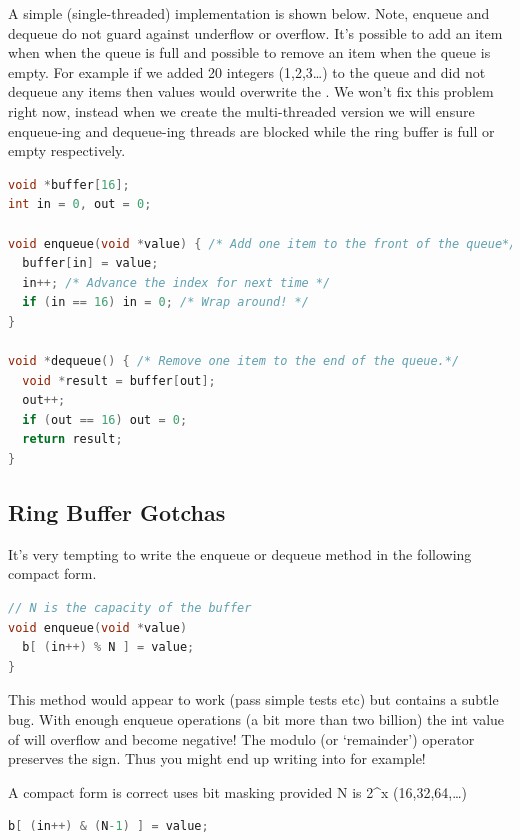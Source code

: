 A simple (single-threaded) implementation is shown below.
Note, enqueue and dequeue do not guard against underflow or overflow.
It's possible to add an item when when the queue is full and possible to remove an item when the queue is empty.
For example if we added 20 integers (1,2,3\ldots{}) to the queue and did not dequeue any items then values  would overwrite the .
We won't fix this problem right now, instead when we create the multi-threaded version we will ensure enqueue-ing and dequeue-ing threads are blocked while the ring buffer is full or empty respectively.

\begin{lstlisting}[language=C]
void *buffer[16];
int in = 0, out = 0;

void enqueue(void *value) { /* Add one item to the front of the queue*/
  buffer[in] = value;
  in++; /* Advance the index for next time */
  if (in == 16) in = 0; /* Wrap around! */
}

void *dequeue() { /* Remove one item to the end of the queue.*/
  void *result = buffer[out];
  out++;
  if (out == 16) out = 0;
  return result;
}
\end{lstlisting}

\subsection{Ring Buffer Gotchas}

It's very tempting to write the enqueue or dequeue method in the following compact form.

\begin{lstlisting}[language=C]
  // N is the capacity of the buffer
void enqueue(void *value)
  b[ (in++) % N ] = value;
}
\end{lstlisting}

This method would appear to work (pass simple tests etc) but contains a subtle bug.
With enough enqueue operations (a bit more than two billion) the int value of  will overflow and become negative! The modulo (or `remainder') operator \keyword{\%} preserves the sign.
Thus you might end up writing into  for example!

A compact form is correct uses bit masking provided N is 2\^{}x (16,32,64,\ldots{})

\begin{lstlisting}[language=C]
b[ (in++) & (N-1) ] = value;
\end{lstlisting}

